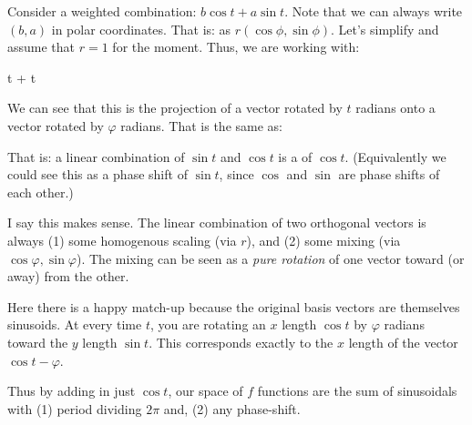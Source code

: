 Consider a weighted combination: $b \cos t + a \sin t$. Note that we can
always write $(b, a)$ in polar coordinates. That is: as $r(\cos \phi,
\sin \phi)$. Let's simplify and assume that $r = 1$ for the moment.
Thus, we are working with:

\begin{nedqn}
  \cos \varphi \cos t + \sin \varphi \sin t
\end{nedqn}

We can see that this is the projection of a vector rotated by $t$
radians onto a vector rotated by $\varphi$ radians. That is the same as:

\begin{nedqn}
  \cos{}
\end{nedqn}

That is: a linear combination of $\sin t$ and $\cos t$ is a
 of $\cos t$. (Equivalently we could see this as a
phase shift of $\sin t$, since $\cos$ and $\sin$ are phase shifts of
each other.)

I say this makes sense. The linear combination of two orthogonal vectors
is always (1) some homogenous scaling (via $r$), and (2) some mixing
(via $\cos\varphi, \sin\varphi$). The mixing can be seen as a \emph{pure
rotation} of one vector toward (or away) from the other.

Here there is a happy match-up because the original basis vectors are
themselves sinusoids. At every time $t$, you are rotating an $x$ length
$\cos t$ by $\varphi$ radians toward the $y$ length $\sin t$. This
corresponds exactly to the $x$ length of the vector $\cos t - \varphi$.

Thus by adding in just $\cos t$, our space of $f$ functions are the sum
of sinusoidals with (1) period dividing $2\pi$ and, (2) any phase-shift.
